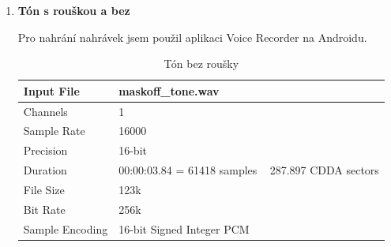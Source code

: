 \documentclass[a4paper]{article}
\begin{document}
    \begin{enumerate}
        \item \textbf{Tón s rouškou a bez}
        
        \vspace{0.5cm}
        
        Pro nahrání nahrávek jsem použil aplikaci Voice Recorder na Androidu.
            \begin{table}[!ht]
                \renewcommand{\arraystretch}{1.5}
                \centering
                \begin{tabular}{|l|l|}
                \hline
                    Input File & maskoff\_tone.wav \\ \hline
                    Channels & 1\\ \hline
                    Sample Rate & 16000\\ \hline
                    Precision & 16-bit\\ \hline
                    Duration & 00:00:03.84 = 61418 samples ~ 287.897 CDDA sectors\\ \hline
                    File Size & 123k\\ \hline
                    Bit Rate & 256k\\ \hline
                    Sample Encoding & 16-bit Signed Integer PCM\\
                \hline
                \end{tabular}
                \caption{Tón bez roušky}
                \label{tab:mask_off_tone}
            \end{table}
         

\end{enumerate}
\end{document}
